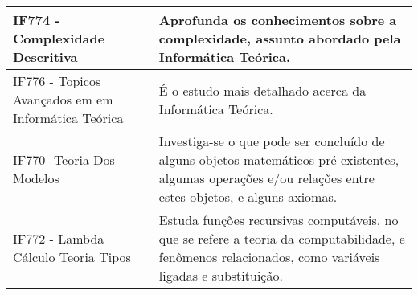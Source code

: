 \documentclass{article}
\begin{document}
    \begin{table}[h]
    \centering
    \begin{tabular}{|p{7cm}|p{6cm}|}
    \hline
    IF774 - Complexidade Descritiva & Aprofunda os conhecimentos sobre a complexidade, assunto abordado pela Informática Teórica.   \\ \hline
    IF776 - Topicos Avançados em  em Informática Teórica & É o estudo mais detalhado acerca da Informática Teórica. \\ \hline
    IF770- Teoria Dos Modelos & Investiga-se o que pode ser concluído de alguns objetos matemáticos pré-existentes, algumas operações e/ou relações entre estes objetos, e alguns axiomas. \\ \hline
    IF772 - Lambda Cálculo Teoria Tipos &  Estuda funções recursivas computáveis, no que se refere a teoria da computabilidade, e fenômenos relacionados, como variáveis ligadas e substituição. \\ \hline
    \end{tabular}
    \end{table}



\end{document}
